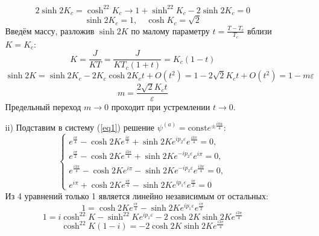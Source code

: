 \documentclass[12pt]{article}
\theoremstyle{definition}
\begin{document}
\begin{enumerate}
\begin{itemize}
\begin{equation}
        2\sinh2K_c=\cosh^22K_c\rightarrow1+\sinh^22K_c-2\sinh2K_c=0
    \end{equation}
    \begin{equation}
        \boxed{\sinh2K_c=1,\quad \cosh K_c=\sqrt{2}}
    \end{equation}
    Введём массу, разложив $\sinh2K$ по малому параметру $t=\frac{T-T_c}{T_c}$ вблизи $K=K_c$:
    \begin{equation}
        K=\frac{J}{KT}=\frac{J}{KT_c(1+t)}=K_c(1-t)
    \end{equation}
    \begin{equation}
        \sinh2K=\sinh2K_c-2K_c\cosh2K_ct+O(t^2)=1-2\sqrt{2}K_ct+O(t^2)=1-m\varepsilon
    \end{equation}
    \begin{equation}
        \boxed{m=\frac{2\sqrt{2}K_ct}{\varepsilon}}
    \end{equation}
    Предельный переход $m\rightarrow0$ проходит при устремлении $t\rightarrow0$.
    \item[ii)] Подставим в систему (\ref{eq1}) решение $\psi^{(a)}=\text{const}e^{\pm\frac{i\pi a}{4}}$:
    \begin{equation}
        \begin{cases}
            e^\frac{i\pi}{4}-\cosh2Ke^\frac{i\pi}{2}+\sinh2Ke^{ip_2\varepsilon}e^\frac{i3\pi}{4}=0,\\
            e^\frac{i\pi}{2}-\cosh2Ke^{\frac{i3\pi}{4}}+\sinh2Ke^{-ip_2\varepsilon}e^{i\pi}=0,\\
            e^\frac{i3\pi}{4}-\cosh2Ke^{i\pi}-\sinh2Ke^{-ip_2\varepsilon}e^{\frac{i3\pi}{4}}=0,\\
            e^{i\pi}+\cosh2Ke^{\frac{i\pi}{4}}-\sinh2Ke^{ip_1\varepsilon}e^{\frac{i\pi}{2}}=0
        \end{cases}
    \end{equation}
    Из 4 уравнений только 1 является линейно независимым от остальных:
    \begin{equation}
        1=\cosh2Ke^{\frac{i\pi}{4}}-\sinh2Ke^{ip_1\varepsilon}e^{\frac{i\pi}{2}}
    \end{equation}
    \begin{equation}
        1=i\cosh^22K-\sinh^22Ke^{ip_1\varepsilon}-2\cosh2K\sinh2Ke^{\frac{i3\pi}{4}}
    \end{equation}
    \begin{equation}
        \cosh^22K(1-i)=-2\cosh2K\sinh2Ke^{\frac{i3\pi}{4}}
    \end{equation}
    \begin{equation}

\end{equation}
\end{itemize}
\end{enumerate}
\end{document}
